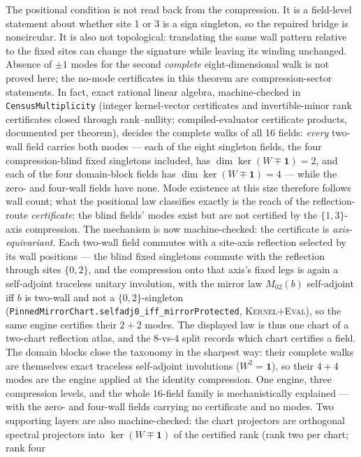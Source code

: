 \documentclass[11pt]{article}
\newcommand{\id}{\mathbf{1}}
\newcommand{\DraftTrust}{\textcolor{draftcolor}{\textsc{Kernel+Eval}}}
\begin{document}
The positional condition is not read back from the compression.  It is a
field-level statement about whether site 1 or 3 is a sign singleton, so the
repaired bridge is noncircular.  It is also not topological: translating the
same wall pattern relative to the fixed sites can change the signature while
leaving its winding unchanged.  Absence of $\pm1$ modes for the second
\emph{complete} eight-dimensional walk is not proved here; the no-mode
certificates in this theorem are compression-sector statements.  In fact,
exact rational linear algebra, machine-checked in
\texttt{CensusMultiplicity} (integer kernel-vector certificates and
invertible-minor rank certificates closed through rank--nullity;
compiled-evaluator certificate products, documented per theorem),
decides the
complete walks of all 16 fields: \emph{every} two-wall field carries both
modes --- each of the eight singleton fields, the four compression-blind
fixed singletons included, has $\dim\ker(W\mp\id)=2$, and each of the four
domain-block fields has $\dim\ker(W\mp\id)=4$ --- while the zero- and
four-wall fields have none.  Mode existence at this size therefore follows wall
count; what the positional law classifies exactly is the reach of the
reflection-route \emph{certificate}: the blind fields' modes exist but are
not certified by the $\{1,3\}$-axis compression.  The mechanism is now
machine-checked: the certificate is \emph{axis-equivariant}.  Each
two-wall field commutes with a site-axis reflection selected by its wall
positions --- the blind fixed singletons commute with the reflection
through sites $\{0,2\}$, and the compression onto that axis's fixed legs
is again a self-adjoint traceless unitary involution, with the mirror law
$M_{02}(b)$ self-adjoint iff $b$ is two-wall and not a $\{0,2\}$-singleton
(\texttt{PinnedMirrorChart.selfadj0\_iff\_mirrorProtected},
\DraftTrust{}), so the same engine certifies their $2+2$ modes.  The
displayed law is thus one chart of a two-chart reflection atlas, and the
$8$-vs-$4$ split records which chart certifies a field.  The domain
blocks close the taxonomy in the sharpest way: their complete walks are
themselves exact traceless self-adjoint involutions ($W^2=\id$), so their
$4+4$ modes are the engine applied at the identity compression.  One
engine, three compression levels, and the whole $16$-field family is
mechanistically explained --- with the zero- and four-wall fields
carrying no certificate and no modes.  Two supporting layers are also
machine-checked: the chart projectors are orthogonal spectral projectors
into $\ker(W\mp\id)$ of the certified rank (rank two per chart; rank four
\end{document}
